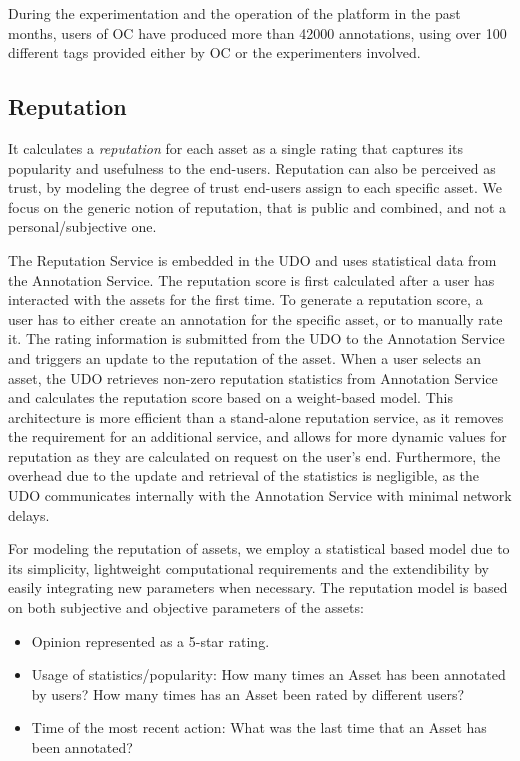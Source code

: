 During the experimentation and the operation of the platform in the past months, users of OC have produced more than 42000 annotations, using over 100 different tags provided either by OC or the experimenters involved.

\subsection{Reputation}

 It calculates a \emph{reputation} for each asset as a single rating that captures its popularity and usefulness to the end-users. Reputation can also be perceived as trust, by modeling the degree of trust end-users assign to each specific asset. We focus on the generic notion of reputation, that is public and combined, and not a personal/subjective one. 

The Reputation Service is embedded in the UDO and uses statistical data from the Annotation Service.
The reputation score is first calculated after a user has interacted with the assets for the first time. To generate a reputation score, a user has to either create an annotation for the specific asset, or to manually rate it. The rating information is submitted from the UDO to the Annotation Service and triggers an update to the reputation of the asset. When a user selects an asset, the UDO retrieves non-zero reputation statistics from Annotation Service and calculates the reputation score based on a weight-based model. This architecture is more efficient than a stand-alone reputation service, as it removes the requirement for an additional service, and allows for more dynamic values for reputation as they are calculated on request on the user's end. Furthermore, the overhead due to the update and retrieval of the statistics is negligible, as the UDO communicates internally with the Annotation Service with minimal network delays.

For modeling the reputation of assets, we employ a statistical based model due to its simplicity, lightweight computational requirements and the extendibility by easily integrating new parameters when necessary. The reputation model is based on both subjective and objective parameters of the assets:

\begin{itemize}
	\item Opinion represented as a 5-star rating.
	\item Usage of statistics/popularity: How many times an Asset has been annotated by users?
            How many times has an Asset been rated by different users?
	\item Time of the most recent action: What was the last time that an Asset has been annotated?
\end{itemize}	

